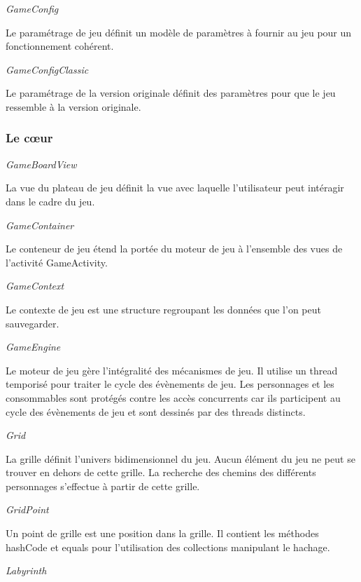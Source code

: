 \documentclass{article}
\begin{document}
\textit{GameConfig}

Le paramétrage de jeu définit un modèle de paramètres à fournir au jeu pour un fonctionnement cohérent.

\medskip

\textit{GameConfigClassic}

Le paramétrage de la version originale définit des paramètres pour que le jeu ressemble à la version originale.

\subsubsection{Le cœur}

\textit{GameBoardView}

La vue du plateau de jeu définit la vue avec laquelle l'utilisateur peut intéragir dans le cadre du jeu.

\medskip

\textit{GameContainer}

Le conteneur de jeu étend la portée du moteur de jeu à l'ensemble des vues de l'activité GameActivity.

\medskip

\textit{GameContext}

Le contexte de jeu est une structure regroupant les données que l’on peut sauvegarder.

\medskip

\textit{GameEngine}

Le moteur de jeu gère l'intégralité des mécanismes de jeu. Il utilise un thread temporisé pour traiter le cycle des évènements de jeu.
Les personnages et les consommables sont protégés contre les accès concurrents car ils participent au cycle des évènements de jeu et sont dessinés par des threads distincts.

\medskip

\textit{Grid}

La grille définit l’univers bidimensionnel du jeu. Aucun élément du jeu ne peut se trouver en dehors de cette grille. La recherche des chemins des différents personnages s'effectue à partir de cette grille.

\medskip

\textit{GridPoint}

Un point de grille est une position dans la grille. Il contient les méthodes hashCode et equals pour l'utilisation des collections manipulant le hachage.

\medskip

\textit{Labyrinth}
\end{document}
